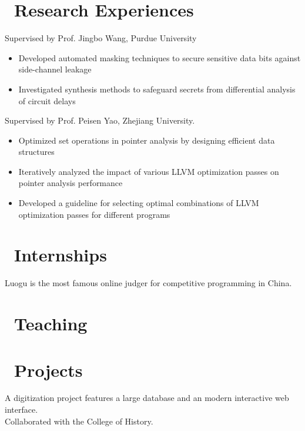 \documentclass{resume}
\begin{document}
\section{\faSearch\ Research Experiences}
Supervised by Prof. Jingbo Wang, Purdue University  
\begin{itemize}[itemsep=0.5ex]  
  \item Developed automated masking techniques to secure sensitive data bits against side-channel leakage  
  \item Investigated synthesis methods to safeguard secrets from differential analysis of circuit delays  
\end{itemize}

Supervised by Prof. Peisen Yao, Zhejiang University.  
\begin{itemize}[itemsep=0.5ex]
  \item Optimized set operations in pointer analysis by designing efficient data structures
  \item Iteratively analyzed the impact of various LLVM optimization passes on pointer analysis performance
  \item Developed a guideline for selecting optimal combinations of LLVM optimization passes for different programs
\end{itemize}

\section{\faUsers\ Internships}
Luogu is the most famous online judger for competitive programming in China.

\section{\faBook\ Teaching}

\section{\faCode\ Projects}
A digitization project features a large database and an modern interactive web interface.\\
Collaborated with the College of History.
\end{document}

